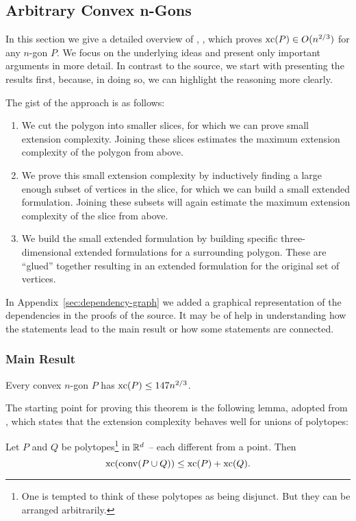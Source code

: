 \subsection{Arbitrary Convex n-Gons}

In this section we give a detailed overview of , \textcite{shitov2020sublinear}, which proves $\operatorname{xc}(P) \in O(n^{2/3})$ for any $n$-gon $P$.
We focus on the underlying ideas and present only important arguments in more detail. In contrast to the source, we start with presenting the results first, because, in doing so, we can highlight the reasoning more clearly.

The gist of the approach is as follows:
\begin{enumerate}
  \item We cut the polygon into smaller slices, for which we can prove small extension complexity. Joining these slices estimates the maximum extension complexity of the polygon from above.
  \item We prove this small extension complexity by inductively finding a large enough subset of vertices in the slice, for which we can build a small extended formulation. Joining these subsets will again estimate the maximum extension complexity of the slice from above.
  \item We build the small extended formulation by building specific three-dimensional extended formulations for a surrounding polygon. These are ``glued'' together resulting in an extended formulation for the original set of vertices.
\end{enumerate}

In Appendix~\ref{sec:dependency-graph} we added a graphical representation of the dependencies in the proofs of the source. It may be of help in understanding how the statements lead to the main result or how some statements are connected.



\subsubsection{Main Result}

\begin{theorem}\label{theorem:xc}
  Every convex $n$-gon $P$ has $\operatorname{xc}(P) \leq 147 n^{2/3}$.
\end{theorem}

The starting point for proving this theorem is the following lemma, adopted from \textcite[Proposition 3.1.1]{weltge2015sizes}, which states that the extension complexity behaves well for unions of polytopes:
\begin{lemma}\label{lemma:union}
  Let $P$ and $Q$ be polytopes\footnote{One is tempted to think of these polytopes as being disjunct. But they can be arranged arbitrarily.} in $\mathbb{R}^d$ -- each different from a point. Then $$\operatorname{xc}(\operatorname{conv}(P \cup Q)) \leq \operatorname{xc}(P) + \operatorname{xc}(Q) .$$
\end{lemma}


